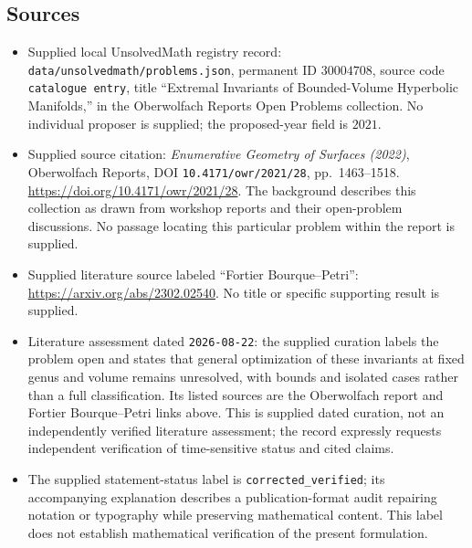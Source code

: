 \documentclass[11pt]{article}
\begin{document}
\subsection{Sources}
\begin{itemize}
\item Supplied local UnsolvedMath registry record: \texttt{data/unsolvedmath/problems.json}, permanent ID \(30004708\), source code \texttt{catalogue entry}, title ``Extremal Invariants of Bounded-Volume Hyperbolic Manifolds,'' in the Oberwolfach Reports Open Problems collection. No individual proposer is supplied; the proposed-year field is \(2021\).
\item Supplied source citation: \emph{Enumerative Geometry of Surfaces (2022)}, Oberwolfach Reports, DOI \texttt{10.4171/owr/2021/28}, pp.\ 1463--1518. \url{https://doi.org/10.4171/owr/2021/28}. The background describes this collection as drawn from workshop reports and their open-problem discussions. No passage locating this particular problem within the report is supplied.
\item Supplied literature source labeled ``Fortier Bourque--Petri'': \url{https://arxiv.org/abs/2302.02540}. No title or specific supporting result is supplied.
\item Literature assessment dated \texttt{2026-08-22}: the supplied curation labels the problem open and states that general optimization of these invariants at fixed genus and volume remains unresolved, with bounds and isolated cases rather than a full classification. Its listed sources are the Oberwolfach report and Fortier Bourque--Petri links above. This is supplied dated curation, not an independently verified literature assessment; the record expressly requests independent verification of time-sensitive status and cited claims.
\item The supplied statement-status label is \texttt{corrected\_verified}; its accompanying explanation describes a publication-format audit repairing notation or typography while preserving mathematical content. This label does not establish mathematical verification of the present formulation.
\end{itemize}
\end{document}
